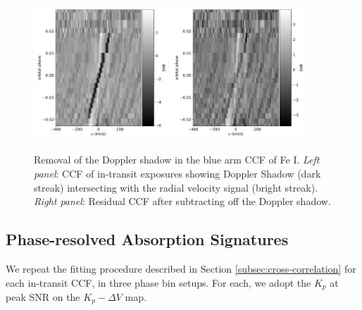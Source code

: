 \documentclass[twocolumn]{aastex631}
\begin{document}
                \begin{figure}
                    \centering
                    \includegraphics[width=0.45\textwidth]{plots/raw-ccf-before/KELT-20b.20190504.Fe.blue.CCFs-raw.pdf}
                    \hspace{0.05\textwidth}
                    \includegraphics[width=0.45\textwidth]{plots/raw-ccf-after/KELT-20b.20190504.Fe.blue.CCFs-raw.pdf}
                    \caption{Removal of the Doppler shadow in the blue arm CCF of Fe I. \textit{Left panel}: CCF of in-transit exposures showing Doppler Shadow (dark streak) intersecting with the radial velocity signal (bright streak). \textit{Right panel}: Residual CCF after subtracting off the Doppler shadow.}
                    \label{fig:doppler-shadow-removal}
                \end{figure}
            
        \subsection{Phase-resolved Absorption Signatures}\label{subsec:Line Velocities}

            We repeat the fitting procedure described in Section \ref{subsec:cross-correlation} for each in-transit CCF, in three phase bin setups. For each, we adopt the $K_p$ at peak SNR on the $K_p-\Delta V$ map.
\end{document}
